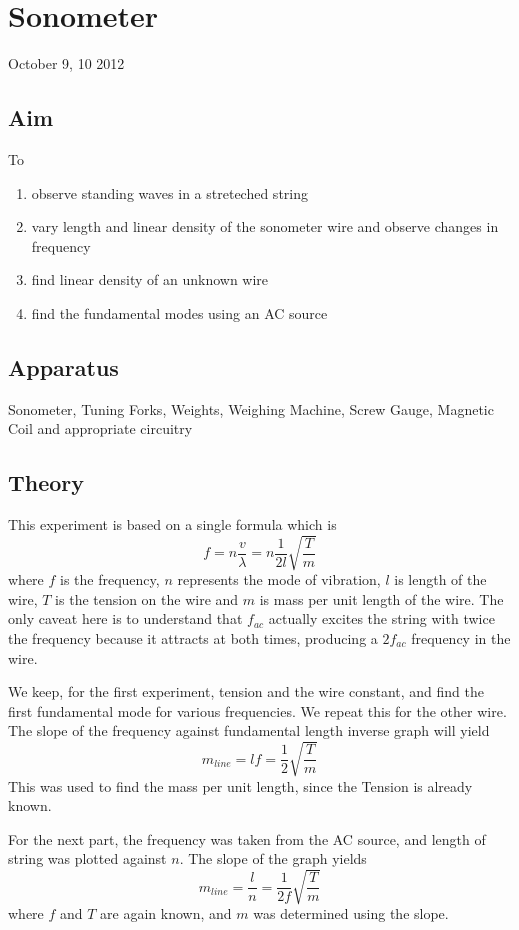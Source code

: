 \chapter{Sonometer}
\begin{flushright}
October 9, 10 2012
\end{flushright}
\section{Aim}
	To 
	\begin{enumerate}
		\item observe standing waves in a streteched string
		\item vary length and linear density of the sonometer wire and observe changes in frequency
		\item find linear density of an unknown wire
		\item find the fundamental modes using an AC source
	\end{enumerate}

	\section{Apparatus}
	Sonometer, Tuning Forks, Weights, Weighing Machine, Screw Gauge, Magnetic Coil and appropriate circuitry

\section{Theory}
	This experiment is based on a single formula which is
	\begin{equation}
		f=n\frac{v}{\lambda}=n\frac{1}{2l}\sqrt{\frac{T}{m}}
	\end{equation}
	where $f$ is the frequency, $n$ represents the mode of vibration, $l$ is length of the wire, $T$ is the tension on the wire and $m$ is mass per unit length of the wire. The only caveat here is to understand that $f_{ac}$ actually excites the string with twice the frequency because it attracts at both times, producing a $2f_{ac}$ frequency in the wire.
	\par
	We keep, for the first experiment, tension and the wire constant, and find the first fundamental mode for various frequencies. We repeat this for the other wire. The slope of the frequency against fundamental length inverse graph will yield
	\begin{equation}
		m_{line}=lf=\frac{1}{2}\sqrt{\frac{T}{m}}
	\end{equation}
	This was used to find the mass per unit length, since the Tension is already known.	
	\par
	For the next part, the frequency was taken from the AC source, and length of string was plotted against $n$. The slope of the graph yields
	\begin{equation}
		m_{line}=\frac{l}{n}=\frac{1}{2f}\sqrt{\frac{T}{m}}
	\end{equation}
	where $f$ and $T$ are again known, and $m$ was determined using the slope.

